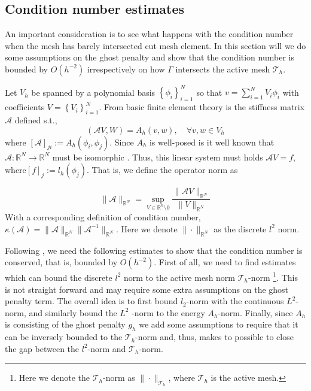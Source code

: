 \subsection{Condition number estimates}%
\label{sub:condition_number_estimates}


An important consideration is to see what happens with the condition number when the mesh has barely intersected cut mesh element. In this section will we do some assumptions on the ghost penalty and show that the condition number is bounded by $O( h^{-2}) $ irrespectively on how $\Gamma $ intersects the active mesh $\mathcal{T}_{h} $.

Let $V_{h}$ be spanned by a polynomial basis  $\left\{ \phi _{i}  \right\}_{i=1}^{N} $ so that $v = \sum_{i=1}^{N} V_{i}\phi _{i}$ with coefficients $V= \left\{ V_{i} \right\} _{i=1}^{N}$. From basic finite element theory is the stiffness matrix
$\mathcal{A} $ defined s.t.,
\[
    ( \mathcal{A} V, W)  = A_{h}( v,w), \quad \forall v,w \in V_{h}
\]
where $ \left[ \mathcal{A} \right] _{ji} := A_{h}( \phi _{i}, \phi_{j} )$.
Since $A_{h}$ is well-posed is it well known that $\mathcal{A}: \mathbb{R} ^{N} \to \mathbb{R} ^{N} $ must be isomorphic \cite{ern2006evaluation}.  Thus, this linear system must holds $ \mathcal{A} V = f$, where$\left[ f \right] _{j} := l_{h}(\phi_{j} )$. That is, we define the operator norm as


\begin{equation}
\label{eq:operator_norm}
 \| \mathcal{A}  \|_{ \mathbb{R} ^{N}  }^{  } = \sup_{V \in \mathbb{R} ^{n} \setminus 0 } \frac{\| \mathcal{A} V \|_{ \mathbb{R} ^{N} }^{  } }{\| V \|_{ \mathbb{R} ^{N} }^{  } }
\end{equation}
 With a corresponding definition of condition number, \( \kappa ( \mathcal{A} )  = \| \mathcal{A}  \|_{ \mathbb{R} ^{N} }^{  } \| \mathcal{A}^{-1}  \|_{ \mathbb{R} ^{N} }^{  }    \).
 Here we denote $\| \cdot  \|_{ \mathbb{R} ^{N} }^{  } $  as the discrete $l^{2}$ norm.

 Following \cite{gurkan2019stabilized}, we need the following estimates to show that the condition number is conserved, that is, bounded by $O( h^{-2}) $. First of all, we need to find estimates which can bound the discrete $l^{2}$ norm to the active
 mesh norm  $\mathcal{T} _{h}$-norm \footnote{Here we denote the $\mathcal{T} _{h}$-norm as $\| \cdot  \|_{\mathcal{T} _{h}  }^{  } $, where $\mathcal{T} _{h}$ is the active mesh.}. This is not straight forward and may require some extra
 assumptions on the ghost penalty term. The overall idea is to first bound $l_{2}$-norm with the continuous $L^{2}$-norm, and similarly bound the $L^{2}$ -norm to the energy $A_{h}$-norm. Finally, since $A_{h}$ is consisting of the ghost penalty $g_{h}$ we add
 some assumptions to require that it can be inversely bounded to the $\mathcal{T} _{h}$-norm and, thus, makes to possible to close the gap between the $l^{2}$-norm and $\mathcal{T} _{h}$-norm.

